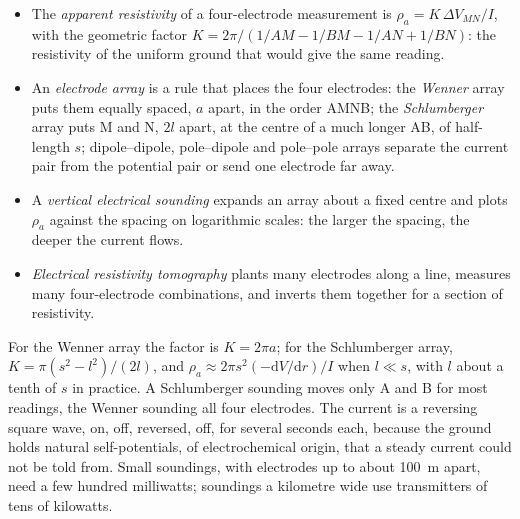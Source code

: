\begin{definition}\label{def:b3:field-lab-methods-3:resistivity}
\leavevmode
\begin{itemize}
  \item The \emph{apparent resistivity} of a
        four-electrode measurement is $\rho_a = K\,\Delta V_{MN}/I$, with
        the geometric factor $K = 2\pi/(1/AM - 1/BM - 1/AN + 1/BN)$: the
        resistivity of the uniform ground that would give the same
        reading.
  \item An \emph{electrode array} is a rule that
        places the four electrodes: the \emph{Wenner} array puts them
        equally spaced, $a$ apart, in the order AMNB; the
        \emph{Schlumberger} array puts M and N, $2l$ apart, at the
        centre of a much longer AB, of half-length $s$; dipole--dipole,
        pole--dipole and pole--pole arrays separate the current pair
        from the potential pair or send one electrode far away.
  \item A \emph{vertical electrical sounding}
        expands an array about a fixed centre and plots
        $\rho_a$ against the spacing on logarithmic scales: the larger
        the spacing, the deeper the current flows.
  \item \emph{Electrical resistivity tomography}
        plants many electrodes along a line,
        measures many four-electrode combinations, and inverts them
        together for a section of resistivity.
\end{itemize}
\end{definition}

For the Wenner array the factor is $K = 2\pi a$; for the Schlumberger
array, $K = \pi(s^2 - l^2)/(2l)$, and $\rho_a \approx 2\pi s^2(-\mathrm{d}V/
\mathrm{d}r)/I$ when $l \ll s$, with $l$ about a tenth of $s$ in
practice. A Schlumberger sounding moves only A and B for most readings,
the Wenner sounding all four electrodes. The current is a reversing
square wave, on, off, reversed, off, for several seconds each, because
the ground holds natural self-potentials, of electrochemical origin,
that a steady current could not be told from. Small soundings, with
electrodes up to about \qty{100}{m} apart, need a few hundred
milliwatts; soundings a kilometre wide use transmitters of tens of
kilowatts.

